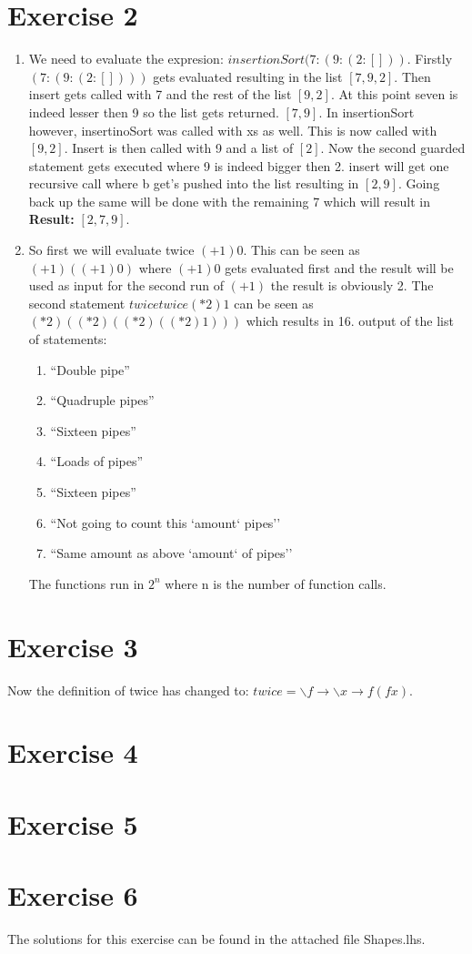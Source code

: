\documentclass{article}
\begin{document}
\section*{Exercise 2}
\begin{enumerate}
  \item We need to evaluate the expresion: $insertionSort (7 : (9 : (2 : [ ]))$.
  Firstly $(7: (9: (2: [ ])))$ gets evaluated resulting in the list $[7,9,2]$. Then insert gets called with 7 and the rest of the list $[9,2]$. At this point seven is indeed lesser then 9 so the list gets returned. $[7,9]$. In insertionSort however, insertinoSort was called with xs as well. This is now called with $[9,2]$. Insert is then called with 9 and a list of $[2]$. Now the second guarded statement gets executed where 9 is indeed bigger then 2. insert will get one recursive call where b get's pushed into the list resulting in $[2,9]$. Going back up the same will be done with the remaining 7 which will result in \textbf{Result:} $[2,7,9]$.
  \item So first we will evaluate twice $(+1) 0$. This can be seen as $(+1) ((+1) 0)$ where $(+1) 0$ gets evaluated first and the result will be used as input for the second run of $(+1)$ the result is obviously 2.
  The second statement $twice twice (*2) 1$ can be seen as $(*2) ((*2) ((*2) ((*2) 1)))$ which results in 16.
  output of the list of statements:
  \begin{enumerate}
    \item ``Double pipe''
    \item ``Quadruple pipes''
    \item ``Sixteen pipes''
    \item ``Loads of pipes''
    \item ``Sixteen pipes''
    \item ``Not going to count this `amount` pipes''
    \item ``Same amount as above `amount` of pipes''
  \end{enumerate}
  The functions run in $2^n$ where n is the number of function calls.
\end{enumerate}

\section*{Exercise 3}
Now the definition of twice has changed to: $twice = \backslash f \rightarrow \backslash x \rightarrow f (f x)$.

\section*{Exercise 4}

\section*{Exercise 5}

\section*{Exercise 6}
The solutions for this exercise can be found in the attached file Shapes.lhs.
\end{document}
